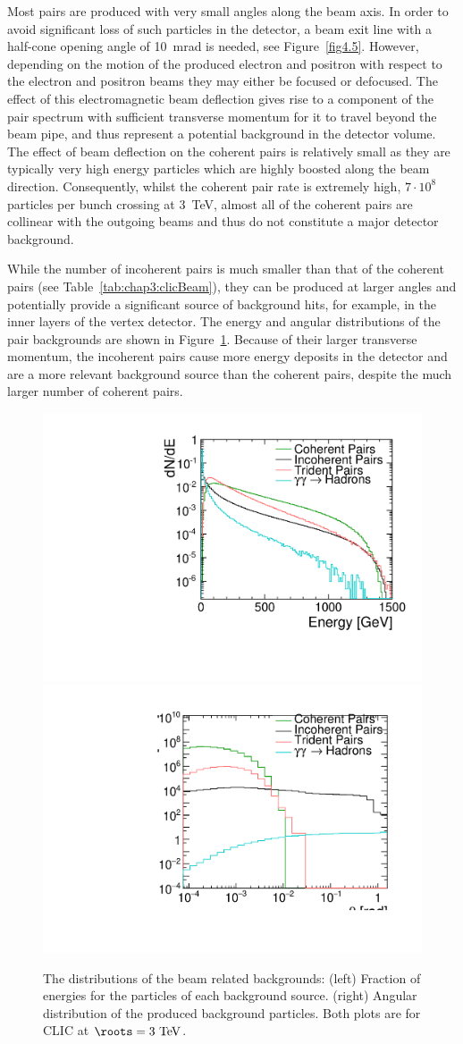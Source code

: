Most pairs are produced with very small angles along the beam axis. In order to
avoid significant loss of such particles in the detector, a beam exit line with
a half-cone opening angle of 10~mrad is needed, see
Figure~\ref{fig4.5}.
However, depending on the motion of the produced electron and positron with
respect to the electron and positron beams they may either be focused or
defocused. The effect of this electromagnetic beam deflection gives rise to
a component of the pair spectrum with sufficient transverse momentum for it to
travel beyond the beam pipe, and thus represent a potential background in the
detector volume. The effect of beam deflection on the coherent pairs is
relatively small as they are typically very high energy particles which are
highly boosted along the beam direction. Consequently, whilst the coherent pair
rate is extremely high, $7\cdot 10^8$ particles per bunch crossing at
3~TeV, almost all of the coherent pairs are collinear with the outgoing beams
and thus do not constitute a major detector background. 

While the number of incoherent pairs is much smaller than that of the coherent
pairs (see Table~\ref{tab:chap3:clicBeam}), they can be produced at larger
angles and potentially provide a significant source of background hits, for example, in
the inner layers of the vertex detector. The energy and angular distributions of
the pair backgrounds are shown in Figure~\ref{fig:chap3:background}. Because of
their larger transverse momentum, the incoherent pairs cause more energy
deposits in the detector and are a more relevant background source than the
coherent pairs, despite the much larger number of coherent pairs.

\begin{figure}[hbt]
\centering
 \includegraphics[width=0.49\linewidth]{../Chap3_ExpCond_PhysPerfsReqs/Energy.pdf} 
 \includegraphics[width=0.49\linewidth]{../Chap3_ExpCond_PhysPerfsReqs/Angle.pdf}
 \caption{The distributions of the beam related backgrounds: (left) Fraction of
   energies for the particles of each background source. (right)
   Angular distribution of the produced background particles. Both plots are for
   CLIC at $\roots=3~\mathrm{TeV}$.\label{fig:chap3:background}}
\end{figure}


